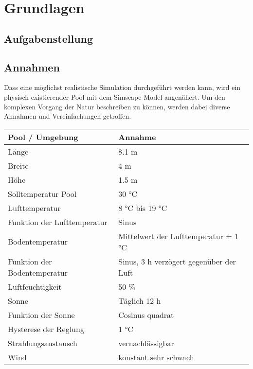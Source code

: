 \section{Grundlagen}
\label{sec:Grundlagen}

\subsection{Aufgabenstellung}
\label{subsec:Aufgabenstellung}

\subsection{Annahmen}
\label{subsec:Annahmen}
Dass eine möglichst realistische Simulation durchgeführt werden kann, wird ein physisch existierender Pool mit dem Simscape-Model angenähert. Um den komplexen Vorgang der Natur beschreiben zu können, werden dabei diverse Annahmen und Vereinfachungen getroffen.

\begin{table}[h]
	\begin{tabular}{l|l}
		Pool / Umgebung              & Annahme                                 \\ \hline
		Länge                        & 8.1 m                                   \\
		Breite                       & 4 m                                     \\
		Höhe                         & 1.5 m                                   \\
		Solltemperatur Pool          & 30 °C                                   \\
		Lufttemperatur      		 & 8 °C bis 19 °C                          \\
		Funktion der Lufttemperatur  & Sinus                                   \\
		Bodentemperatur              & Mittelwert der Lufttemperatur ± 1 °C    \\
		Funktion der Bodentemperatur & Sinus, 3 h verzögert gegenüber der Luft \\
		Luftfeuchtigkeit             & 50 \%                                   \\
		Sonne                        & Täglich 12 h                            \\
		Funktion der Sonne           & Cosinus quadrat                         \\
		Hysterese der Reglung		 & 1 °C									   \\
		Strahlungsaustausch			 & vernachlässigbar						   \\
		Wind						 & konstant sehr schwach
	\end{tabular}
\end{table}


